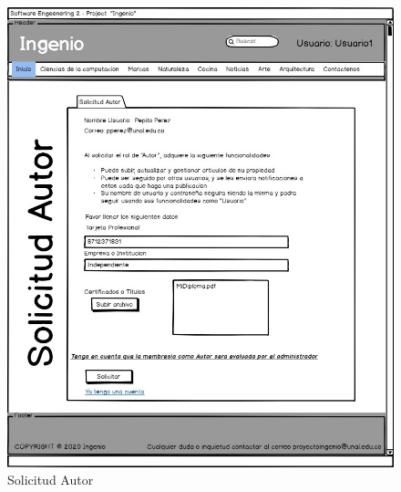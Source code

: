 \documentclass[a4paper,12 pt]{article}
\begin{document}
\begin{figure}[H]
    \centering
    \includegraphics[scale = 0.7]{images/SolicitudAutor.jpg}
    \caption{Solicitud Autor}
    \label{F103}
\end{figure}{}
\end{document}
